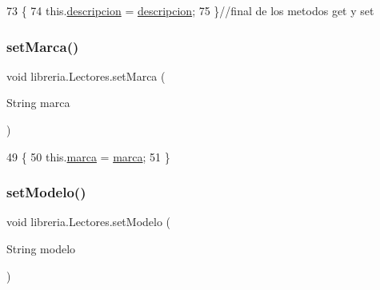 \begin{DoxyCode}
73                                                    \{
74         this.\mbox{\hyperlink{classlibreria_1_1_lectores_a3e79587af255ae572a923c0158f00f2a}{descripcion}} = \mbox{\hyperlink{classlibreria_1_1_lectores_a3e79587af255ae572a923c0158f00f2a}{descripcion}};
75     \}\textcolor{comment}{//final de los metodos get y set}
\end{DoxyCode}
\mbox{\label{classlibreria_1_1_lectores_a2677af7cb69e10d064819b3a6b7a101a}} 
\subsubsection{\texorpdfstring{set\+Marca()}{setMarca()}}
{\footnotesize\ttfamily void libreria.\+Lectores.\+set\+Marca (\begin{DoxyParamCaption}\item[{String}]{marca }\end{DoxyParamCaption})\hspace{0.3cm}{\ttfamily [inline]}}


\begin{DoxyCode}
49                                        \{
50         this.\mbox{\hyperlink{classlibreria_1_1_lectores_ad062e7b5e6ca8443096c555db878b5c5}{marca}} = \mbox{\hyperlink{classlibreria_1_1_lectores_ad062e7b5e6ca8443096c555db878b5c5}{marca}};
51     \}
\end{DoxyCode}
\mbox{\label{classlibreria_1_1_lectores_aac3a6f7cb3390a10a4fdb388ebab5590}} 
\subsubsection{\texorpdfstring{set\+Modelo()}{setModelo()}}
{\footnotesize\ttfamily void libreria.\+Lectores.\+set\+Modelo (\begin{DoxyParamCaption}\item[{String}]{modelo }\end{DoxyParamCaption})\hspace{0.3cm}{\ttfamily [inline]}}


